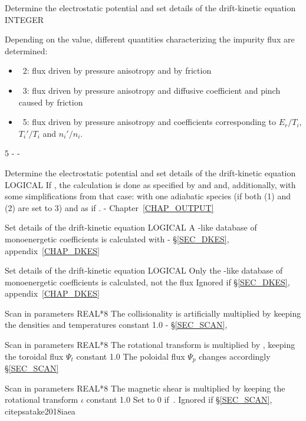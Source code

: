 {Determine the electrostatic potential and set details of the drift-kinetic equation}
{INTEGER}
{Depending on the value, different quantities characterizing the impurity flux are determined:
\begin{itemize}
\item ~2: flux driven by pressure anisotropy and by friction
\item ~3: flux driven by pressure anisotropy and diffusive coefficient and pinch caused by friction
\item ~5: flux driven by pressure anisotropy and coefficients corresponding to $E_r/T_i$, $T_i'/T_i$ and $n_i'/n_i$.
\end{itemize}}
{5}
{-}
{-}

{Determine the electrostatic potential and set details of the drift-kinetic equation}
{LOGICAL}
{If , the calculation is done as specified by  and  and, additionally, with some simplifications from that case: with one adiabatic species (if both (1) and (2) are set to 3) and as if .}
{\false}
{-}
{Chapter~\ref{CHAP_OUTPUT}}


{Set details of the drift-kinetic equation}
{LOGICAL}
{A \DKES-like database of monoenergetic coefficients is calculated with \KNOSOS}
{\false}
{-}
{\S\ref{SEC_DKES}, appendix~\ref{CHAP_DKES}}

{Set details of the drift-kinetic equation}
{LOGICAL}
{Only the \DKES-like database of monoenergetic coefficients is calculated, not the flux}
{\false}
{Ignored if \notf{}}
{\S\ref{SEC_DKES}, appendix~\ref{CHAP_DKES}}

{Scan in parameters}
{REAL*8}
{The collisionality is artificially multiplied by  keeping the densities and temperatures constant}
{1.0}
{-}
{\S\ref{SEC_SCAN}, \citep{satake2018iaea}}

{Scan in parameters}
{REAL*8}
{The rotational transform is multiplied by , keeping the toroidal flux $\Psi_t$ constant}
{1.0}
{The poloidal flux $\Psi_p$ changes accordingly}
{\S\ref{SEC_SCAN}}

{Scan in parameters}
{REAL*8}
{The magnetic shear is multiplied by  keeping the rotational transform $\iota$ constant}
{1.0}
{Set to 0 if~. Ignored if \notf{}}
{\S\ref{SEC_SCAN}, citep{satake2018iaea}}

